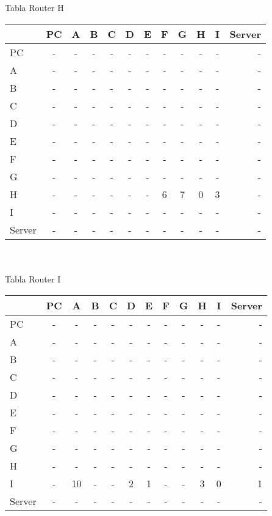 \documentclass{article}
\begin{document}
\\
\\
Tabla Router H \\
\begin{tabular}{l*{10}{c}r}
              & PC & A & B & C & D & E & F & G & H & I & Server \\
\hline
PC             & - & - & - & - & - & - & - & - & - & - & - \\
A              & - & - & - & - & - & - & - & - & - & - & - \\
B              & - & - & - & - & - & - & - & - & - & - & - \\
C              & - & - & - & - & - & - & - & - & - & - & - \\
D              & - & - & - & - & - & - & - & - & - & - & - \\
E              & - & - & - & - & - & - & - & - & - & - & - \\
F              & - & - & - & - & - & - & - & - & - & - & - \\
G              & - & - & - & - & - & - & - & - & - & - & - \\
H              & - & - & - & - & - & - & 6 & 7 & 0 & 3 & -\\
I              & - & - & - & - & - & - & - & - & - & - & - \\
Server         & - & - & - & - & - & - & - & - & - & - & - \\

\end{tabular}
\\
\\
Tabla Router I \\
\begin{tabular}{l*{10}{c}r}
              & PC & A & B & C & D & E & F & G & H & I & Server \\
\hline
PC             & - & - & - & - & - & - & - & - & - & - & -\\
A              & - & - & - & - & - & - & - & - & - & - & -\\
B              & - & - & - & - & - & - & - & - & - & - & -\\
C              & - & - & - & - & - & - & - & - & - & - & -\\
D              & - & - & - & - & - & - & - & - & - & - & -\\
E              & - & - & - & - & - & - & - & - & - & - & -\\
F              & - & - & - & - & - & - & - & - & - & - & -\\
G              & - & - & - & - & - & - & - & - & - & - & -\\
H              & - & - & - & - & - & - & - & - & - & - & -\\
I              & - & 10 & - & - & 2 & 1 & - & - & 3 & 0 & 1\\
Server         & - & - & - & - & - & - & - & - & - & - & -\\

\end{tabular}
\end{document}
